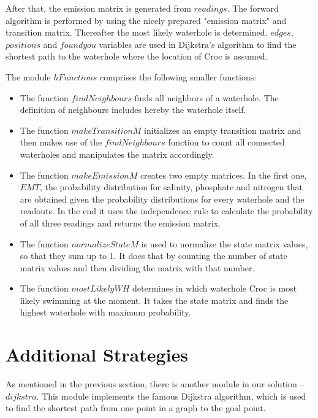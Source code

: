 \documentclass[a4paper]{article}
\begin{document}
After that, the emission matrix is generated from $readings$. The forward algorithm is performed by using the nicely prepared "emission matrix" and transition matrix. Thereafter the most likely waterhole is determined. $edges$, $positions$ and $foundyou$ variables are used in Dijkstra's algorithm to find the shortest path to the waterhole where the location of Croc is assumed.

The module $hFunctions$ comprises the following smaller functions: 
\begin{itemize}
\item The function $findNeighbours$ finds all neighbors of a waterhole. The definition of neighbours includes hereby the waterhole itself. 
\item The function $makeTransitionM$ initializes an empty transition matrix and then makes use of the $findNeighbours$ function to count all connected waterholes and manipulates the matrix accordingly. 
\item The function $makeEmissionM$ creates two empty matrices. In the first one, $EMT$, the probability distribution for salinity, phosphate and nitrogen that are obtained given the probability distributions for every  waterhole and the readouts. In the end it uses the independence rule to calculate the probability of all three readings and returns the emission matrix.
\item The function $normalizeStateM$ is used to normalize the state matrix values, so that they sum up to 1. It does that by counting  the number of state matrix values and then dividing the matrix with that number.
\item The function $mostLikelyWH$ determines in which waterhole Croc is most likely swimming at the moment. It takes the state matrix and finds the highest waterhole with maximum probability.

\end{itemize}

\section{Additional Strategies}
As mentioned in the previous section, there is another module in our solution -- $dijkstra$. This module implements the famous Dijkstra algorithm, which is used to find the shortest path from one point in a graph to the goal point.
\end{document}
